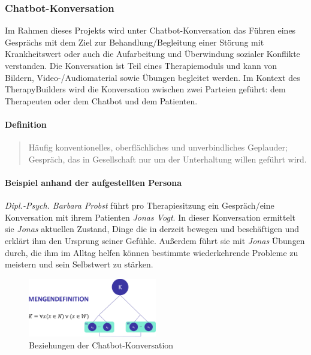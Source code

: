 \subsubsection{Chatbot-Konversation}
Im Rahmen dieses Projekts wird unter Chatbot-Konversation das Führen  eines Gesprächs mit dem Ziel zur Behandlung/Begleitung einer Störung mit Krankheitswert oder auch die Aufarbeitung und Überwindung sozialer Konflikte verstanden. Die Konversation ist Teil eines Therapiemoduls und kann von Bildern, Video-/Audiomaterial sowie Übungen begleitet werden. Im Kontext des TherapyBuilders wird die Konversation zwischen zwei Parteien geführt: dem Therapeuten oder dem Chatbot und dem Patienten.

\paragraph{Definition}
\begin{quote}
Häufig konventionelles, oberflächliches und unverbindliches Geplauder; Gespräch, das in Gesellschaft nur um der Unterhaltung willen geführt wird. \cite{DudenKon2:online}
\end{quote}

\paragraph{Beispiel anhand der aufgestellten Persona}
\emph{Dipl.-Psych. Barbara Probst} führt pro Therapiesitzung ein Gespräch/eine Konversation mit ihrem Patienten \emph{Jonas Vogt}. In dieser Konversation ermittelt sie \emph{Jonas} aktuellen Zustand, Dinge die in derzeit bewegen und beschäftigen und erklärt ihm den Ursprung seiner Gefühle. Außerdem führt sie mit \emph{Jonas} Übungen durch, die ihm im Alltag helfen können bestimmte wiederkehrende Probleme zu meistern und sein Selbstwert zu stärken.

\begin{figure}[h]
\centering
\includegraphics[width=0.5\textwidth]{pictures/konvesationdef}
\caption{Beziehungen der Chatbot-Konversation}
\label{therapiedef}
\end{figure}


